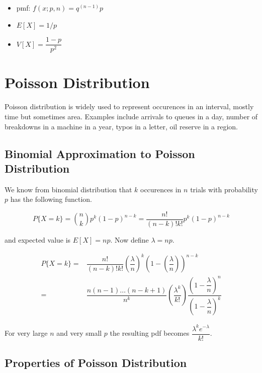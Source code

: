 \documentclass[]{book}
\theoremstyle{definition}
\theoremstyle{definition}
\theoremstyle{definition}
\theoremstyle{remark}
\begin{document}
\begin{itemize}
\item
  pmf: \(f(x;p,n) = q^{(n-1)}p\)
\item
  \(E[X] = 1/p\)
\item
  \(V[X] = \dfrac{1-p}{p^2}\)
\end{itemize}

\hypertarget{poisson-distribution}{%
\section{Poisson Distribution}\label{poisson-distribution}}

Poisson distribution is widely used to represent occurences in an
interval, mostly time but sometimes area. Examples include arrivals to
queues in a day, number of breakdowns in a machine in a year, typos in a
letter, oil reserve in a region.

\hypertarget{binomial-approximation-to-poisson-distribution}{%
\subsection{Binomial Approximation to Poisson
Distribution}\label{binomial-approximation-to-poisson-distribution}}

We know from binomial distribution that \(k\) occurences in \(n\) trials
with probability \(p\) has the following function.

\[P\{X = k\} = \binom{n}{k} p^k (1-p)^{n-k} = \dfrac{n!}{(n-k)!k!} p^k (1-p)^{n-k}\]

and expected value is \(E[X] = np\). Now define \(\lambda = np\).

\begin{align*}
P\{X = k\} =& \dfrac{n!}{(n-k)!k!} \left(\dfrac{\lambda}{n}\right)^k \left(1-\left(\dfrac{\lambda}{n}\right)\right)^{n-k} \\
           =& \dfrac{n (n-1) \dots (n-k+1)}{n^k} \left(\dfrac{\lambda^k}{k!}\right) \dfrac{(1-\dfrac{\lambda}{n})^n}{(1-\dfrac{\lambda}{n})^k}
\end{align*}

For very large \(n\) and very small \(p\) the resulting pdf becomes
\(\dfrac{\lambda^k e^{-\lambda}}{k!}\).

\hypertarget{properties-of-poisson-distribution}{%
\subsection{Properties of Poisson
Distribution}\label{properties-of-poisson-distribution}}
\end{document}
